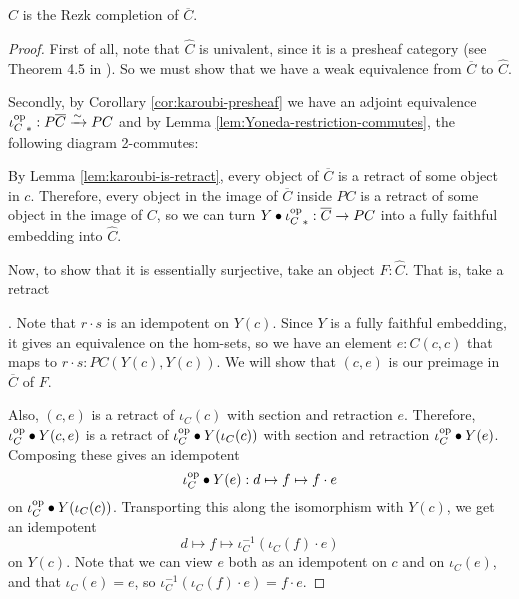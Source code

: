 \begin{lemma}\label{lem:retracts-rezk}
  $ \hat C $ is the Rezk completion of $ \overline C $.
\end{lemma}
\begin{proof}
  First of all, note that $ \hat C $ is univalent, since it is a presheaf category (see Theorem 4.5 in \cite{univalent-categories}). So we must show that we have a weak equivalence from $ \overline C $ to $ \hat C $.

  Secondly, by Corollary \ref{cor:karoubi-presheaf} we have an adjoint equivalence $ {\iota_C^{\text{op}}}_*: P \overline C \xrightarrow \sim P C $ and by Lemma \ref{lem:Yoneda-restriction-commutes}, the following diagram 2-commutes:
  \begin{center}
  \end{center}

  By Lemma \ref{lem:karoubi-is-retract}, every object of $ \overline C $ is a retract of some object in $ c $. Therefore, every object in the image of $ \overline C $ inside $ P C $ is a retract of some object in the image of $ C $, so we can turn $ Y \bullet {\ensuremath{\iota_C^{\text{op}}}}_* : \overline C \to P C $ into a fully faithful embedding into $ \hat C $.

  Now, to show that it is essentially surjective, take an object $ F : \hat C $. That is, take a retract . Note that $ r \cdot s $ is an idempotent on $ Y(c) $. Since $ Y $ is a fully faithful embedding, it gives an equivalence on the hom-sets, so we have an element $ e : C(c, c) $ that maps to $ r \cdot s : P C (Y(c), Y(c)) $. We will show that $ (c, e) $ is our preimage in $ \overline C $ of $ F $.

  Also, $ (c, e) $ is a retract of $ \iota_C(c) $ with section and retraction $ e $. Therefore, $ \iota_C^{\text{op}} \bullet Y(c, e) $ is a retract of $ \iota_C^{\text{op}} \bullet Y (\iota_C (c)) $ with section and retraction $ \iota_C^{\text{op}} \bullet Y(e) $. Composing these gives an idempotent
  \[ \iota_C^{\text{op}} \bullet Y(e): d \mapsto f \mapsto f \cdot e \]
  on $ \iota_C^{\text{op}} \bullet Y (\iota_C (c)) $. Transporting this along the isomorphism with $ Y(c) $, we get an idempotent
  \[ d \mapsto f \mapsto \iota_C^{-1}(\iota_C(f) \cdot e) \]
  on $ Y(c) $. Note that we can view $ e $ both as an idempotent on $ c $ and on $ \iota_C(e) $, and that $ \iota_C(e) = e $, so $ \iota_C^{-1}(\iota_C(f) \cdot e) = f \cdot e $.


\end{proof}
